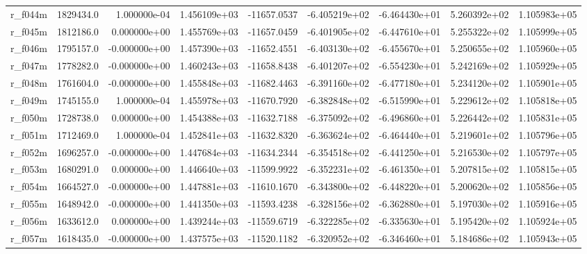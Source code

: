 \documentclass[12pt]{article}
\begin{document}
\begin{landscape}
\begin{longtable}{|l|r|r|r|r|r|r|r|r|}
r\_f044m                 &  1829434.0 &  1.000000e-04 &  1.456109e+03 & -11657.0537 & -6.405219e+02 & -6.464430e+01 &  5.260392e+02 &  1.105983e+05 \\
r\_f045m                 &  1812186.0 &  0.000000e+00 &  1.455769e+03 & -11657.0459 & -6.401905e+02 & -6.447610e+01 &  5.255322e+02 &  1.105999e+05 \\
r\_f046m                 &  1795157.0 & -0.000000e+00 &  1.457390e+03 & -11652.4551 & -6.403130e+02 & -6.455670e+01 &  5.250655e+02 &  1.105960e+05 \\
r\_f047m                 &  1778282.0 & -0.000000e+00 &  1.460243e+03 & -11658.8438 & -6.401207e+02 & -6.554230e+01 &  5.242169e+02 &  1.105929e+05 \\
r\_f048m                 &  1761604.0 & -0.000000e+00 &  1.455848e+03 & -11682.4463 & -6.391160e+02 & -6.477180e+01 &  5.234120e+02 &  1.105901e+05 \\
r\_f049m                 &  1745155.0 &  1.000000e-04 &  1.455978e+03 & -11670.7920 & -6.382848e+02 & -6.515990e+01 &  5.229612e+02 &  1.105818e+05 \\
r\_f050m                 &  1728738.0 &  0.000000e+00 &  1.454388e+03 & -11632.7188 & -6.375092e+02 & -6.496860e+01 &  5.226442e+02 &  1.105831e+05 \\
r\_f051m                 &  1712469.0 &  1.000000e-04 &  1.452841e+03 & -11632.8320 & -6.363624e+02 & -6.464440e+01 &  5.219601e+02 &  1.105796e+05 \\
r\_f052m                 &  1696257.0 & -0.000000e+00 &  1.447684e+03 & -11634.2344 & -6.354518e+02 & -6.441250e+01 &  5.216530e+02 &  1.105797e+05 \\
r\_f053m                 &  1680291.0 &  0.000000e+00 &  1.446640e+03 & -11599.9922 & -6.352231e+02 & -6.461350e+01 &  5.207815e+02 &  1.105815e+05 \\
r\_f054m                 &  1664527.0 & -0.000000e+00 &  1.447881e+03 & -11610.1670 & -6.343800e+02 & -6.448220e+01 &  5.200620e+02 &  1.105856e+05 \\
r\_f055m                 &  1648942.0 & -0.000000e+00 &  1.441350e+03 & -11593.4238 & -6.328156e+02 & -6.362880e+01 &  5.197030e+02 &  1.105916e+05 \\
r\_f056m                 &  1633612.0 &  0.000000e+00 &  1.439244e+03 & -11559.6719 & -6.322285e+02 & -6.335630e+01 &  5.195420e+02 &  1.105924e+05 \\
r\_f057m                 &  1618435.0 & -0.000000e+00 &  1.437575e+03 & -11520.1182 & -6.320952e+02 & -6.346460e+01 &  5.184686e+02 &  1.105943e+05 \\

\end{longtable}
\end{landscape}
\end{document}
